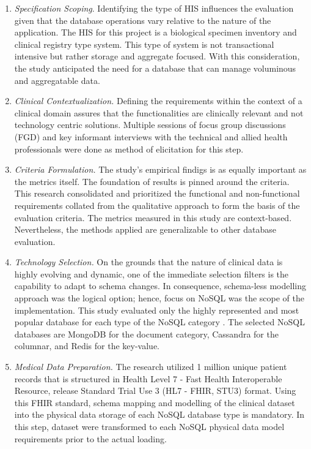 \documentclass[5p]{elsarticle}
\begin{document}
\begin{enumerate}
\item \emph{Specification Scoping}. 
Identifying the type of HIS influences the evaluation given that the database operations vary relative to the nature of the application.
The HIS for this project is a biological specimen inventory and clinical registry type system. 
This type of system is not transactional intensive but rather storage and aggregate focused. 
With this consideration, the study anticipated the need for a database that can manage voluminous and aggregatable data.

\item \emph{Clinical Contextualization.} 
Defining the requirements within the context of a clinical domain assures that the functionalities are clinically relevant and not technology centric solutions.
Multiple sessions of focus group discussions (FGD) and key informant interviews with the technical and allied health professionals were done as method of elicitation for this step. 

\item \emph{Criteria Formulation.} 
The study's empirical findigs is as equally important as the metrics itself. The foundation of results is pinned around the criteria.
This research consolidated and prioritized the functional and non-functional requirements collated from the qualitative approach to form the basis of the evaluation criteria.
The metrics measured in this study are context-based. Nevertheless, the methods applied are generalizable to other database evaluation.

\item \emph{Technology Selection.} 
On the grounds that the nature of clinical data is highly evolving and dynamic, one of the immediate selection filters is the capability to adapt to schema changes. In consequence, schema-less modelling approach was the logical option; hence, focus on NoSQL was the scope of the implementation. 
This study evaluated only the highly represented and most popular database for each type of the NoSQL category \cite{DBEnginesRanking2018}.
The selected NoSQL databases are MongoDB for the document category, Cassandra for the columnar, and Redis for the key-value.

\item \emph{Medical Data Preparation.} 
The research utilized 1 million unique patient records that is structured in Health Level 7 - Fast Health Interoperable Resource, release Standard Trial Use 3 (HL7 - FHIR, STU3) format.
Using this FHIR standard, schema mapping and modelling of the clinical dataset into the physical data storage of each NoSQL database type is mandatory.
In this step, dataset were transformed to each NoSQL physical data model requirements prior to the actual loading. 


\end{enumerate}
\end{document}
